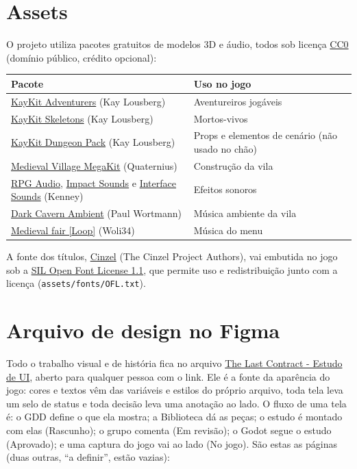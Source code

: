 \documentclass[11pt,a4paper]{article}
\begin{document}
\section{Assets}

O projeto utiliza pacotes gratuitos de modelos 3D e áudio, todos sob licença \href{https://creativecommons.org/publicdomain/zero/1.0/}{CC0} (domínio público, crédito opcional):

\begin{xltabular}{\textwidth}{@{}lX@{}}
\toprule
\textbf{Pacote} & \textbf{Uso no jogo} \\
\midrule
\href{https://kaylousberg.itch.io/kaykit-adventurers}{KayKit Adventurers} (Kay Lousberg) & Aventureiros jogáveis \\
\href{https://kaylousberg.itch.io/kaykit-skeletons}{KayKit Skeletons} (Kay Lousberg) & Mortos-vivos \\
\href{https://kaylousberg.itch.io/kaykit-dungeon-pack}{KayKit Dungeon Pack} (Kay Lousberg) & Props e elementos de cenário (não usado no chão) \\
\href{https://quaternius.itch.io/medieval-village-megakit}{Medieval Village MegaKit} (Quaternius) & Construção da vila \\
\href{https://kenney.nl/assets/rpg-audio}{RPG Audio}, \href{https://kenney.nl/assets/impact-sounds}{Impact Sounds} e \href{https://kenney.nl/assets/interface-sounds}{Interface Sounds} (Kenney) & Efeitos sonoros \\
\href{https://opengameart.org/content/dark-cavern-ambient}{Dark Cavern Ambient} (Paul Wortmann) & Música ambiente da vila \\
\href{https://opengameart.org/content/medieval-fair-loop}{Medieval fair [Loop]} (Woli34) & Música do menu \\
\bottomrule
\end{xltabular}

A fonte dos títulos, \href{https://github.com/NDISCOVER/Cinzel}{Cinzel} (The Cinzel Project Authors), vai embutida no jogo sob a \href{https://openfontlicense.org}{SIL Open Font License 1.1}, que permite uso e redistribuição junto com a licença (\texttt{assets/fonts/OFL.txt}).

\section{Arquivo de design no Figma}
\label{sec:figma}

Todo o trabalho visual e de história fica no arquivo \href{https://www.figma.com/design/OUXX0RlOXTqWtFt3Azhk1f/The-Last-Contract---Estudo-de-UI}{The Last Contract - Estudo de UI}, aberto para qualquer pessoa com o link. Ele é a fonte da aparência do jogo: cores e textos vêm das variáveis e estilos do próprio arquivo, toda tela leva um selo de status e toda decisão leva uma anotação ao lado. O fluxo de uma tela é: o GDD define o que ela mostra; a Biblioteca dá as peças; o estudo é montado com elas (Rascunho); o grupo comenta (Em revisão); o Godot segue o estudo (Aprovado); e uma captura do jogo vai ao lado (No jogo). São estas as páginas (duas outras, ``a definir'', estão vazias):
\end{document}

